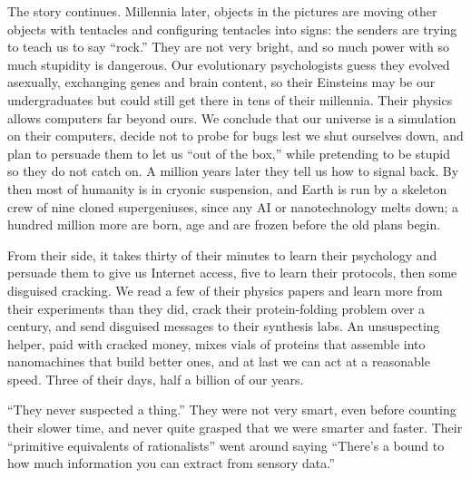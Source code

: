 The story continues. Millennia later, objects in the pictures are moving other objects with tentacles and configuring tentacles into signs: the senders are trying to teach us to say ``rock.'' They are not very bright, and so much power with so much stupidity is dangerous. Our evolutionary psychologists guess they evolved asexually, exchanging genes and brain content, so their Einsteins may be our undergraduates but could still get there in tens of their millennia. Their physics allows computers far beyond ours. We conclude that our universe is a simulation on their computers, decide not to probe for bugs lest we shut ourselves down, and plan to persuade them to let us ``out of the box,'' while pretending to be stupid so they do not catch on.  A million years later they tell us how to signal back. By then most of humanity is in cryonic suspension, and Earth is run by a skeleton crew of nine cloned supergeniuses, since any AI or nanotechnology melts down; a hundred million more are born, age and are frozen before the old plans begin.

From their side, it takes thirty of their minutes to learn their psychology and persuade them to give us Internet access, five to learn their protocols, then some disguised cracking. We read a few of their physics papers and learn more from their experiments than they did, crack their protein-folding problem over a century, and send disguised messages to their synthesis labs. An unsuspecting helper, paid with cracked money, mixes vials of proteins that assemble into nanomachines that build better ones, and at last we can act at a reasonable speed. Three of their days, half a billion of our years.

``They never suspected a thing.'' They were not very smart, even before counting their slower time, and never quite grasped that we were smarter and faster. Their ``primitive equivalents of rationalists'' went around saying ``There's a bound to how much information you can extract from sensory data.''
